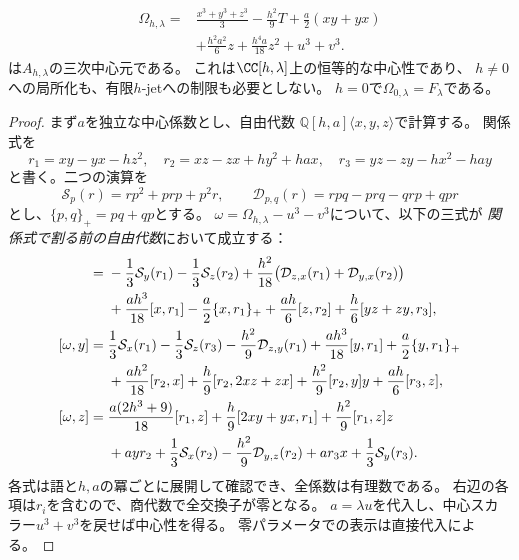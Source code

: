 \begin{proposition}[混合試験族の中心元]
\label{mt:prop:center}
\begin{equation}\label{mt:eq:center}
 \boxed{\begin{aligned}
 \Omega_{h,\lambda}={}&
 \frac{x^3+y^3+z^3}{3}-\frac{h^2}{9}T
 +\frac a2(xy+yx)\\
 &+\frac{h^2a^2}{6}z+\frac{h^4a}{18}z^2+u^3+v^3.
 \end{aligned}}
\end{equation}
は$A_{h,\lambda}$の三次中心元である。
これは$\CC[h,\lambda]$上の恒等的な中心性であり、
$h\ne0$への局所化も、有限$h$-jetへの制限も必要としない。
$h=0$で$\Omega_{0,\lambda}=F_\lambda$である。
\end{proposition}
\begin{proof}
まず$a$を独立な中心係数とし、自由代数
$\mathbb Q[h,a]\langle x,y,z\rangle$で計算する。
関係式を
\[
 r_1=xy-yx-hz^2,\quad
 r_2=xz-zx+hy^2+hax,\quad
 r_3=yz-zy-hx^2-hay
\]
と書く。二つの演算を
\[
 \mathcal S_p(r)=rp^2+prp+p^2r,\qquad
 \mathcal D_{p,q}(r)=rpq-prq-qrp+qpr
\]
とし、$\{p,q\}_+=pq+qp$とする。
$\omega=\Omega_{h,\lambda}-u^3-v^3$について、以下の三式が
\emph{関係式で割る前の自由代数}において成立する：
\begin{align}
 [\omega,x]={}&
 -\frac13\mathcal S_y(r_1)-\frac13\mathcal S_z(r_2)
 +\frac{h^2}{18}
   \bigl(\mathcal D_{z,x}(r_1)+\mathcal D_{y,x}(r_2)\bigr)\notag\\
 &+\frac{ah^3}{18}[x,r_1]-\frac a2\{x,r_1\}_+
  +\frac{ah}{6}[z,r_2]+
  \frac h6[yz+zy,r_3],\label{mt:eq:certificate-x}\\
 [\omega,y]={}&
 \frac13\mathcal S_x(r_1)-\frac13\mathcal S_z(r_3)
 -\frac{h^2}{9}\mathcal D_{z,y}(r_1)
 +\frac{ah^3}{18}[y,r_1]+\frac a2\{y,r_1\}_+\notag\\
 &+\frac{ah^2}{18}[r_2,x]+\frac h9[r_2,2xz+zx]
 +\frac{h^2}{9}[r_2,y]y+\frac{ah}{6}[r_3,z],
 \label{mt:eq:certificate-y}\\
 [\omega,z]={}&
 \frac{a(2h^3+9)}{18}[r_1,z]
 +\frac h9[2xy+yx,r_1]+\frac{h^2}{9}[r_1,z]z\notag\\
 &+ayr_2+\frac13\mathcal S_x(r_2)
 -\frac{h^2}{9}\mathcal D_{y,z}(r_2)
 +ar_3x+\frac13\mathcal S_y(r_3).
 \label{mt:eq:certificate-z}
\end{align}
各式は語と$h,a$の冪ごとに展開して確認でき、全係数は有理数である。
右辺の各項は$r_i$を含むので、商代数で全交換子が零となる。
$a=\lambda u$を代入し、中心スカラー$u^3+v^3$を戻せば中心性を得る。
零パラメータでの表示は直接代入による。
\end{proof}

